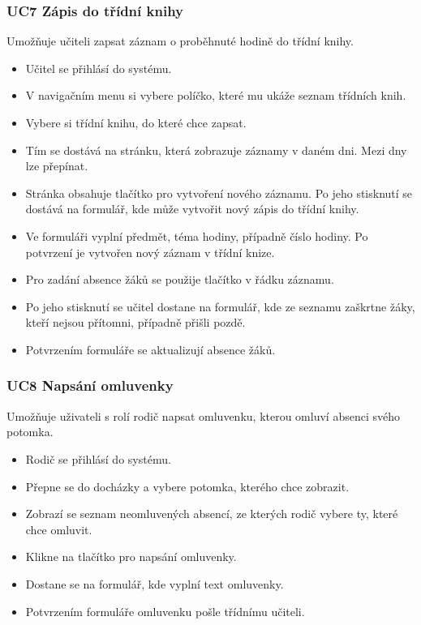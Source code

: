 \subsubsection*{UC7 Zápis do třídní knihy}
Umožňuje učiteli zapsat záznam o proběhnuté hodině do třídní knihy.
\begin{itemize}
    \item Učitel se přihlásí do systému.
    \item V navigačním menu si vybere políčko, které mu ukáže seznam třídních knih.
    \item Vybere si třídní knihu, do které chce zapsat.
    \item Tím se dostává na stránku, která zobrazuje záznamy v daném dni. Mezi dny lze přepínat.
    \item Stránka obsahuje tlačítko pro vytvoření nového záznamu. Po jeho stisknutí se dostává na formulář, kde může vytvořit nový zápis do třídní knihy.
    \item Ve formuláři vyplní předmět,  téma hodiny, případně číslo hodiny. Po potvrzení je vytvořen nový záznam v třídní knize. 
    \item Pro zadání absence žáků se použije tlačítko v řádku záznamu. 
    \item Po jeho stisknutí se učitel dostane na formulář, kde ze seznamu zaškrtne žáky, kteří nejsou přítomni, případně přišli pozdě.
    \item Potvrzením formuláře se aktualizují absence žáků.
\end{itemize}

\subsubsection*{UC8 Napsání omluvenky}
Umožňuje uživateli s rolí rodič napsat omluvenku, kterou omluví absenci svého potomka.
\begin{itemize}
    \item Rodič se přihlásí do systému.
    \item Přepne se do docházky a vybere potomka, kterého chce zobrazit.
    \item Zobrazí se seznam neomluvených absencí, ze kterých rodič vybere ty, které chce omluvit.
    \item Klikne na tlačítko pro napsání omluvenky.
    \item Dostane se na formulář, kde vyplní text omluvenky.
    \item Potvrzením formuláře omluvenku pošle třídnímu učiteli.
\end{itemize}

